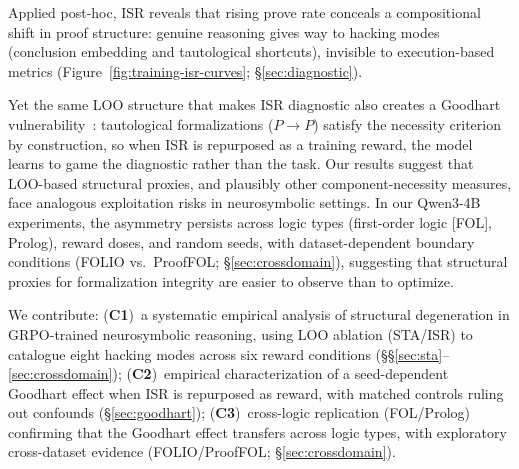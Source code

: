 Applied post-hoc, ISR reveals that rising prove rate conceals a compositional shift in proof structure: genuine reasoning gives way to hacking modes (conclusion embedding and tautological shortcuts), invisible to execution-based metrics (Figure~\ref{fig:training-isr-curves}; \S\ref{sec:diagnostic}).

Yet the same LOO structure that makes ISR diagnostic also creates a Goodhart vulnerability~\citep{manheim-goodhart-taxonomy, karwowski-goodhart-rl, gao-reward-overoptimization}: tautological formalizations ($P{\to}P$) satisfy the necessity criterion by construction, so when ISR is repurposed as a training reward, the model learns to game the diagnostic rather than the task.
Our results suggest that LOO-based structural proxies, and plausibly other component-necessity measures, face analogous exploitation risks in neurosymbolic settings.
In our Qwen3-4B experiments, the asymmetry persists across logic types (first-order logic [FOL], Prolog), reward doses, and random seeds, with dataset-dependent boundary conditions (FOLIO vs.\ ProofFOL; \S\ref{sec:crossdomain}), suggesting that structural proxies for formalization integrity are easier to observe than to optimize.

We contribute:
(\textbf{C1})~a systematic empirical analysis of structural degeneration in GRPO-trained neurosymbolic reasoning, using LOO ablation (STA/ISR) to catalogue eight hacking modes across six reward conditions (\S\S\ref{sec:sta}--\ref{sec:crossdomain});
(\textbf{C2})~empirical characterization of a seed-dependent Goodhart effect when ISR is repurposed as reward, with matched controls ruling out confounds (\S\ref{sec:goodhart});
(\textbf{C3})~cross-logic replication (FOL/Prolog) confirming that the Goodhart effect transfers across logic types, with exploratory cross-dataset evidence (FOLIO/ProofFOL; \S\ref{sec:crossdomain}).
